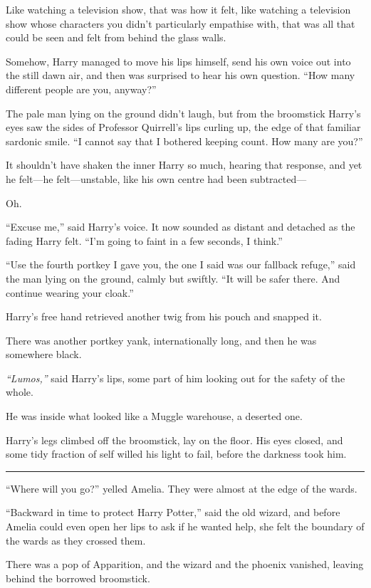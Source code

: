 Like watching a television show, that was how it felt, like watching a
television show whose characters you didn't particularly empathise with,
that was all that could be seen and felt from behind the glass walls.

Somehow, Harry managed to move his lips himself, send his own voice out
into the still dawn air, and then was surprised to hear his own
question. ``How many different people are you, anyway?''

The pale man lying on the ground didn't laugh, but from the broomstick
Harry's eyes saw the sides of Professor Quirrell's lips curling up, the
edge of that familiar sardonic smile. ``I cannot say that I bothered
keeping count. How many are you?''

It shouldn't have shaken the inner Harry so much, hearing that response,
and yet he felt---he felt---unstable, like his own centre had been
subtracted---

Oh.

``Excuse me,'' said Harry's voice. It now sounded as distant and
detached as the fading Harry felt. ``I'm going to faint in a few
seconds, I think.''

``Use the fourth portkey I gave you, the one I said was our fallback
refuge,'' said the man lying on the ground, calmly but swiftly. ``It
will be safer there. And continue wearing your cloak.''

Harry's free hand retrieved another twig from his pouch and snapped it.

There was another portkey yank, internationally long, and then he was
somewhere black.

\emph{``Lumos,''} said Harry's lips, some part of him looking out for
the safety of the whole.

He was inside what looked like a Muggle warehouse, a deserted one.

Harry's legs climbed off the broomstick, lay on the floor. His eyes
closed, and some tidy fraction of self willed his light to fail, before
the darkness took him.

\begin{center}\rule{3in}{0.4pt}\end{center}

``Where will you go?'' yelled Amelia. They were almost at the edge of
the wards.

``Backward in time to protect Harry Potter,'' said the old wizard, and
before Amelia could even open her lips to ask if he wanted help, she
felt the boundary of the wards as they crossed them.

There was a pop of Apparition, and the wizard and the phoenix vanished,
leaving behind the borrowed broomstick.
